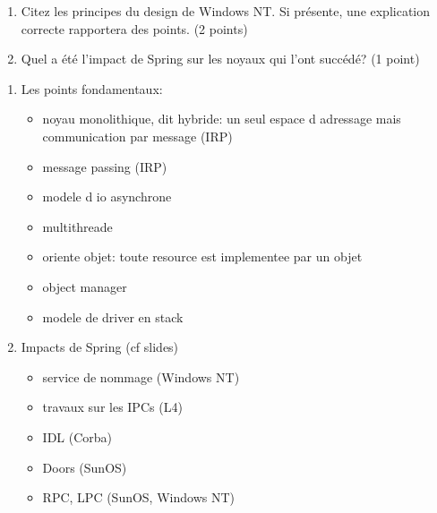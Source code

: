 \begin{enumerate}
  \item
	Citez les principes du design de Windows NT. Si pr\'esente, une explication
	correcte rapportera des points. (2 points)
  \item
	Quel a \'et\'e l'impact de Spring sur les noyaux qui l'ont succ\'ed\'e? (1 point)
\end{enumerate}

\begin{correction}

\begin{enumerate}
  \item
	Les points fondamentaux:
	\begin{itemize}
	  \item noyau monolithique, dit hybride: un seul espace d adressage mais
	  communication par message (IRP)
	  \item message passing (IRP)
          \item modele d io asynchrone
	  \item multithreade
	  \item oriente objet: toute resource est implementee par un objet
	  \item object manager
	  \item modele de driver en stack
	\end{itemize}
  \item
	Impacts de Spring (cf slides)
	\begin{itemize}
	  \item service de nommage (Windows NT)
	  \item travaux sur les IPCs (L4)
	  \item IDL (Corba)
	  \item Doors (SunOS)
	  \item RPC, LPC (SunOS, Windows NT)
	\end{itemize}
\end{enumerate}

\end{correction}


